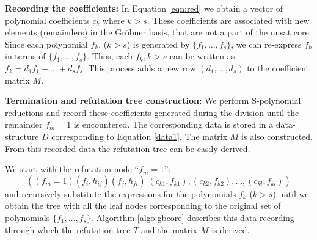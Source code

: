 {\bf Recording the coefficients:} In Equation \ref{eqn:red} we obtain a
vector of polynomial coefficients $c_k$ where $k>s$. These
coefficients are associated with new elements (remainders) in the
Gr\"obner basis, that are not a part of the unsat core. 
Since each polynomial $f_k$, ($k>s$) is generated by
$\{f_1,\dots,f_s\}$, we can re-express $f_k$ in terms of $\{f_1,\dots,
f_s\}$. Thus, each $f_k, k>s$ can be written as $f_k = d_1f_1 + \dots
+ d_sf_s$. This process adds a new row $(d_1,\dots,d_s)$ to the
coefficient matrix $M$. 



{\bf Termination and refutation tree construction:} We perform
S-polynomial reductions and record these coefficients  generated
during the division until the remainder $f_m = 1$ is encountered. The
corresponding data is stored in a data-structure $D$ corresponding to
Equation \ref{data1}. The matrix $M$ is also constructed. From this
recorded data the refutation tree can be easily derived. 

We start with the refutation node ``$f_m=1$'':
\begin{displaymath}
((f_{m}=1)(f_{i},h_{ij})(f_{j},h_{ji})| (c_{k1},f_{k1}),(c_{k2},f_{k2}),\dots,(c_{kl},f_{kl}))
\end{displaymath}
and recursively substitute the expressions for the polynomials $f_k$
($k>s$) until we obtain the tree with all the leaf nodes corresponding
to the original set of polynomials $\{f_1,\dots,f_s\}$. Algorithm
\ref{algo:gbcore} describes this data recording through which the
refutation tree $T$ and the matrix $M$ is derived. 

